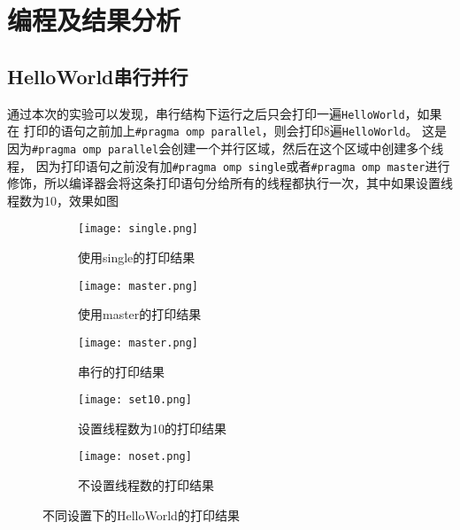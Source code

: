 \documentclass{article}
\begin{document}
\section{编程及结果分析}
\subsection{HelloWorld串行并行}
\indent 通过本次的实验可以发现，串行结构下运行之后只会打印一遍\texttt{HelloWorld}，如果在
打印的语句之前加上\texttt{\#pragma omp parallel}，则会打印8遍\texttt{HelloWorld}。
这是因为\texttt{\#pragma omp parallel}会创建一个并行区域，然后在这个区域中创建多个线程，
因为打印语句之前没有加\texttt{\#pragma omp single}或者\texttt{\#pragma omp master}进行
修饰，所以编译器会将这条打印语句分给所有的线程都执行一次，其中如果设置线程数为10，效果如图
\begin{figure}[H]
    \centering
    \begin{subfigure}[b]{0.3\textwidth}
        \centering
        \texttt{[image: single.png]}
        \caption{使用single的打印结果}
    \end{subfigure}
    \hfill
    \begin{subfigure}[b]{0.3\textwidth}
        \centering
        \texttt{[image: master.png]}
        \caption{使用master的打印结果}
    \end{subfigure}
    \hfill
    \begin{subfigure}[b]{0.3\textwidth}
        \centering
        \texttt{[image: master.png]}
        \caption{串行的打印结果}
    \end{subfigure}

    \begin{subfigure}[b]{0.45\textwidth}
        \centering
        \texttt{[image: set10.png]}
        \caption{设置线程数为10的打印结果}
    \end{subfigure}
    \hfill
    \begin{subfigure}[b]{0.45\textwidth}
        \centering
        \texttt{[image: noset.png]}
        \caption{不设置线程数的打印结果}
    \end{subfigure}
    \caption{不同设置下的HelloWorld的打印结果}
\end{figure}
\end{document}
